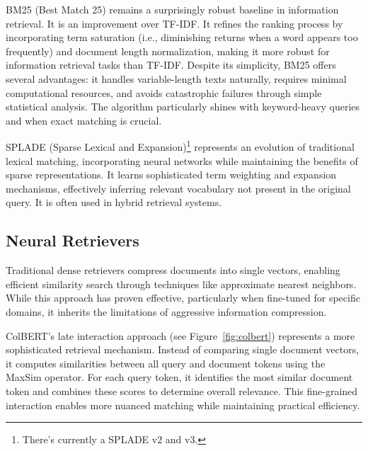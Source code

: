 \documentclass[notoc, tikz]{tufte-handout}
\begin{document}
BM25 (Best Match 25) remains a surprisingly robust baseline in information retrieval. 
It is an improvement over TF-IDF.
It refines the ranking process by incorporating term saturation (i.e., diminishing returns when a word appears too frequently) and document length normalization, making it more robust for information retrieval tasks than TF-IDF.
Despite its simplicity, BM25 offers several advantages:
it handles variable-length texts naturally, requires minimal computational resources, and avoids catastrophic failures through simple statistical analysis. The algorithm particularly shines with keyword-heavy queries and when exact matching is crucial.


SPLADE \citep{splade} (Sparse Lexical and Expansion)\footnote{There's currently a SPLADE v2 and v3.} represents an evolution of traditional lexical matching, incorporating neural networks while maintaining the benefits of sparse representations. It learns sophisticated term weighting and expansion mechanisms, effectively inferring relevant vocabulary not present in the original query. 
It is often used in hybrid retrieval systems.

\subsection{Neural Retrievers}

Traditional dense retrievers compress documents into single vectors, enabling efficient similarity search through techniques like approximate nearest neighbors. While this approach has proven effective, particularly when fine-tuned for specific domains, it inherits the limitations of aggressive information compression.

ColBERT's late interaction approach (see Figure~\ref{fig:colbert}) represents a more sophisticated retrieval mechanism. Instead of comparing single document vectors, it computes similarities between all query and document tokens using the MaxSim operator. For each query token, it identifies the most similar document token and combines these scores to determine overall relevance. This fine-grained interaction enables more nuanced matching while maintaining practical efficiency.
\end{document}
